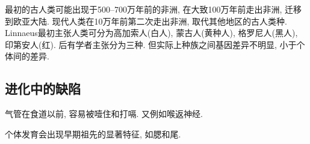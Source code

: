 \documentclass{ctexart}
\begin{document}
最初的古人类可能出现于500--700万年前的非洲, 在大致100万年前走出非洲, 迁移到欧亚大陆. 现代人类在10万年前第二次走出非洲, 取代其他地区的古人类种. Linnaeus最初主张人类可分为高加索人(白人), 蒙古人(黄种人), 格罗尼人(黑人), 印第安人(红). 后有学者主张分为三种. 但实际上种族之间基因差异不明显, 小于个体间的差异.



\subsection{进化中的缺陷} %
\label{sub:进化中的缺陷}

气管在食道以前, 容易被噎住和打嗝. 又例如喉返神经.
\par
个体发育会出现早期祖先的显著特征, 如腮和尾.


\end{document}
